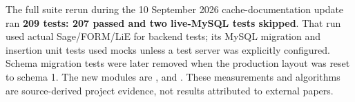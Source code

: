 The full suite rerun during the 10 September 2026 cache-documentation update ran \textbf{209 tests: 207 passed and
two live-MySQL tests skipped}. That run used actual Sage/FORM/LiE for backend tests;
its MySQL migration and insertion unit tests used mocks unless a test server
was explicitly configured. Schema migration tests were later removed when
the production layout was reset to schema 1. The new modules are
, 
and . These measurements and algorithms
are source-derived project evidence, not results attributed to external papers.
